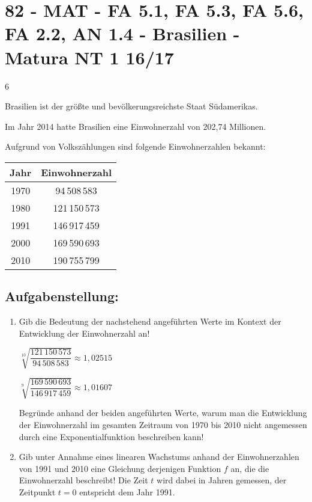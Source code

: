 \section{82 - MAT - FA 5.1, FA 5.3, FA 5.6, FA 2.2, AN 1.4 - Brasilien - Matura NT 1 16/17}


\begin{langesbeispiel} \item[6] %

Brasilien ist der größte und bevölkerungsreichste Staat Südamerikas.\leer

Im Jahr 2014 hatte Brasilien eine Einwohnerzahl von 202,74 Millionen.\leer

Aufgrund von Volkszählungen sind folgende Einwohnerzahlen bekannt:

\begin{center}
	\begin{tabular}{|c|c|}\hline
	\cellcolor[gray]{0.9}Jahr&\cellcolor[gray]{0.9}Einwohnerzahl\\ \hline
	1970&94\,508\,583\\ \hline
	1980&121\,150\,573\\ \hline
	1991&146\,917\,459\\ \hline
	2000&169\,590\,693\\ \hline
	2010&190\,755\,799\\ \hline
	\end{tabular}
\end{center}

\subsection{Aufgabenstellung:}
\begin{enumerate}
	\item {} Gib die Bedeutung der nachstehend angeführten Werte im Kontext der Entwicklung der Einwohnerzahl an!\leer
	
	$\sqrt[10]{\dfrac{121\,150\,573}{94\,508\,583}}\approx 1,02515$\leer
	
	$\sqrt[9]{\dfrac{169\,590\,693}{146\,917\,459}}\approx 1,01607$\leer
	
	Begründe anhand der beiden angeführten Werte, warum man die Entwicklung der Einwohnerzahl im gesamten Zeitraum von 1970 bis 2010 nicht angemessen durch eine Exponentialfunktion beschreiben kann!\leer
	
	\item Gib unter Annahme eines linearen Wachstums anhand der Einwohnerzahlen von 1991 und 2010 eine Gleichung derjenigen Funktion $f$ an, die die Einwohnerzahl beschreibt! Die Zeit $t$ wird dabei in Jahren gemessen, der Zeitpunkt $t=0$ entspricht dem Jahr 1991.
	

\end{enumerate}
\end{langesbeispiel}
